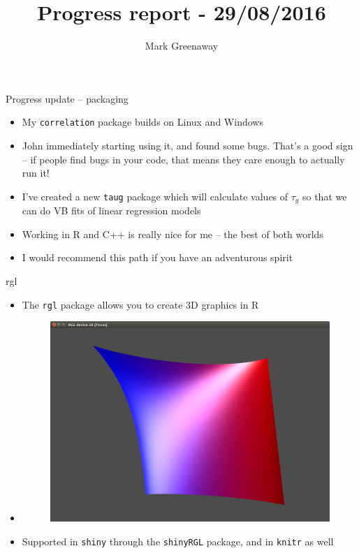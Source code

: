 \documentclass{beamer}
\title{Progress report - 29/08/2016}
\author{Mark Greenaway}
\begin{document}
\begin{frame}
\maketitle
\end{frame}

\begin{frame}{Progress update -- packaging}
\begin{itemize}
\item My \texttt{correlation} package builds on Linux and Windows
\item John immediately starting using it, and found some bugs. That's a good sign -- if people
find bugs in your code, that means they care enough to actually run it!
\item I've created a new \texttt{taug} package which will calculate values of $\tau_g$ so that we
can do VB fits of linear regression models
\item Working in R and C++ is really nice for me -- the best of both worlds
\item I would recommend this path if you have an adventurous spirit
\end{itemize}
\end{frame}

\begin{frame}{rgl}
\begin{itemize}
\item The \texttt{rgl} package allows you to create 3D graphics in R
\item
\begin{figure}
\includegraphics[scale=.3]{rgl_taug.png}
\end{figure}
\item Supported in \texttt{shiny} through the \texttt{shinyRGL} package, and in \texttt{knitr} as well
\end{itemize}
\end{frame}
\end{document}
